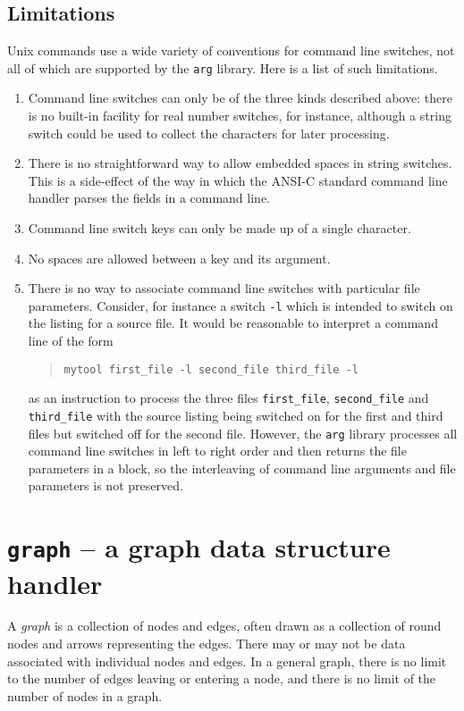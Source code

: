 \section{Limitations}
Unix commands use a wide variety of conventions for command line switches, not all of 
which are supported by the {\tt arg} library. Here is a list of such limitations.
\begin{enumerate}
\item Command line switches can only be of the three kinds
described above: there is no built-in facility for real number switches, for instance, although
a string switch could be used to collect the characters for later processing.
\item There is no straightforward way to allow embedded spaces in string switches. This is a
side-effect of the way in which the ANSI-C standard command line handler parses the fields in
a command line.
\item Command line switch keys can only be made up of a single character.
\item No spaces are allowed between a key and its argument.

\item There is no way to associate command line switches with particular
file parameters. Consider, for instance a switch {\tt -l} which is
intended to switch on the listing for a source file. It would be reasonable to interpret a 
command line of the form
\begin{quote}
\small
\begin{verbatim}
mytool first_file -l second_file third_file -l
\end{verbatim}
\end{quote}
as an instruction to process the three files
\verb+first_file+, \verb+second_file+ and \verb+third_file+
with the source listing being switched on for the first and third files but switched off for the
second file. However, the {\tt arg} library processes all command line switches in left to
right order and then returns the file parameters in a block, so the interleaving of command
line arguments and file parameters is not preserved.

\end{enumerate}

\chapter{{\tt graph} -- a graph data structure handler}

A {\em graph} is a collection of nodes and edges, often drawn
as a collection of round nodes and arrows representing the
edges. There may or may not be data associated with individual nodes and
edges. In a general graph, there is no limit to the number of edges leaving
or entering a node, and there is no limit of the number of nodes in a
graph.

